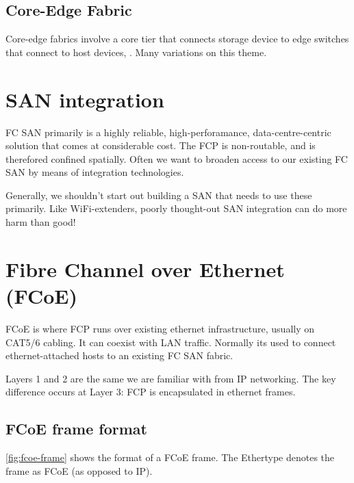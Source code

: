 \subsection{Core-Edge Fabric}
\label{sec:core-edge-fabric}

Core-edge fabrics involve a core tier that connects storage device to
edge switches that connect to host devices, . Many variations on this
theme.


\section{SAN integration}
\label{sec:san-integration}

FC SAN primarily is a highly reliable, high-perforamance,
data-centre-centric solution that comes at considerable cost. The FCP is
non-routable, and is therefored confined spatially. Often we want to
broaden access to our existing FC SAN by means of integration
technologies.

Generally, we shouldn't start out building a SAN that needs to use these
primarily. Like WiFi-extenders, poorly thought-out SAN integration can
do more harm than good!

\section{Fibre Channel over Ethernet (FCoE)}
\label{sec:fibre-channel-over-ethernet-fcoe}

FCoE is where FCP runs over existing ethernet infrastructure, usually on
CAT5/6 cabling. It can coexist with LAN traffic. Normally its used to
connect ethernet-attached hosts to an existing FC SAN fabric.

Layers 1 and 2 are the same we are familiar with from IP networking. The
key difference occurs at Layer 3: FCP is encapsulated in ethernet
frames.

\subsection{FCoE frame format}
\label{sec:fcoe-frame-format}

\autoref{fig:fcoe-frame} shows the format of a FCoE frame.
The Ethertype denotes the frame as FCoE (as opposed to IP).


